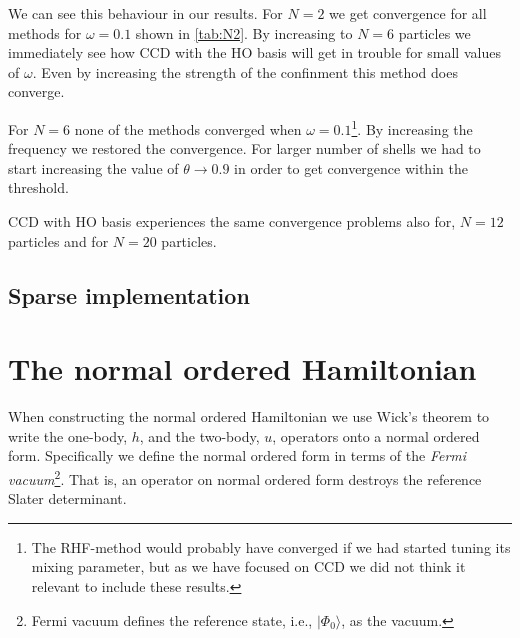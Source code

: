 \documentclass[
    a4paper, aps, twocolumn, floatfix, superscriptaddress,
    nofootinbib]{revtex4-1}
\newcommand{\1}{\mathds{1}}
\newcommand{\ket}[1]{\rvert #1\rangle}
\newcommand{\kslat}{\ket{\Phi_0}}
\begin{document}
        We can see this behaviour in our results. For $N = 2$ we get convergence
        for all methods for $\omega = 0.1$ shown in \autoref{tab:N2}. By
        increasing to $N = 6$ particles we immediately see how CCD with the HO
        basis will get in trouble for small values of $\omega$. Even by increasing
        the strength of the confinment this method does converge.

        For $N = 6$ none of the methods converged when $\omega =
        0.1$\footnote{The RHF-method would probably have converged if we had
        started tuning its mixing parameter, but as we have focused on CCD we did
        not think it relevant to include these results.}. By increasing the
        frequency we restored the convergence. For larger number of shells we
        had to start increasing the value of $\theta \to 0.9$ in order to get
        convergence within the threshold.

        CCD with HO basis experiences the same convergence problems also for,
        $N=12$ particles and for $N=20$ particles.

    \subsection{Sparse implementation}

\appendix
\section{The normal ordered Hamiltonian}
    When constructing the normal ordered Hamiltonian we use Wick's theorem to
    write the one-body, $h$, and the two-body, $u$, operators onto a normal
    ordered form. Specifically we define the normal ordered form in terms of the
    \emph{Fermi vacuum}\footnote{Fermi vacuum defines the reference state, i.e.,
    $\kslat$, as the vacuum.}. That is, an operator on normal ordered form
    destroys the reference Slater determinant.
\end{document}
